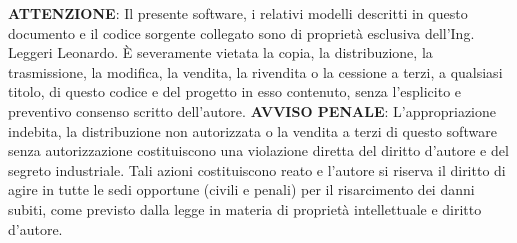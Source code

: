 \documentclass[12pt,a4paper]{article}
\begin{document}
\vspace{0.3cm}
\noindent
\textbf{ATTENZIONE}: Il presente software, i relativi modelli descritti in questo documento e il codice sorgente collegato sono di proprietà esclusiva dell'Ing. Leggeri Leonardo. 
\vspace{0.3cm}
\noindent
È severamente vietata la copia, la distribuzione, la trasmissione, la modifica, la vendita, la rivendita o la cessione a terzi, a qualsiasi titolo, di questo codice e del progetto in esso contenuto, senza l'esplicito e preventivo consenso scritto dell'autore. 
\vspace{0.3cm}
\noindent
\textbf{AVVISO PENALE}: L'appropriazione indebita, la distribuzione non autorizzata o la vendita a terzi di questo software senza autorizzazione costituiscono una violazione diretta del diritto d'autore e del segreto industriale. Tali azioni costituiscono reato e l'autore si riserva il diritto di agire in tutte le sedi opportune (civili e penali) per il risarcimento dei danni subiti, come previsto dalla legge in materia di proprietà intellettuale e diritto d'autore.
\end{document}
